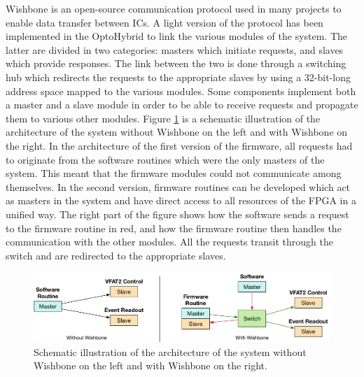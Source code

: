       Wishbone is an open-source communication protocol used in many projects to enable data transfer between ICs. A light version of the protocol has been implemented in the OptoHybrid to link the various modules of the system. The latter are divided in two categories: masters which initiate requests, and slaves which provide responses. The link between the two is done through a switching hub which redirects the requests to the appropriate slaves by using a 32-bit-long address space mapped to the various modules. Some components implement both a master and a slave module in order to be able to receive requests and propagate them to various other modules. Figure \ref{fig:II-3-wishbone-arch} is a schematic illustration of the architecture of the system without Wishbone on the left and with Wishbone on the right. In the architecture of the first version of the firmware, all requests had to originate from the software routines which were the only masters of the system. This meant that the firmware modules could not communicate among themselves. In the second version, firmware routines can be developed which act as masters in the system and have direct access to all resources of the FPGA in a unified way. The right part of the figure shows how the software sends a request to the firmware routine in red, and how the firmware routine then handles the communication with the other modules. All the requests transit through the switch and are redirected to the appropriate slaves. \\

      \begin{figure}[h!]
        \centering
        \includegraphics[width=\textwidth]{img/II-3-test-beam/wishbone_arch}
        \caption{Schematic illustration of the architecture of the system without Wishbone on the left and with Wishbone on the right.}
        \label{fig:II-3-wishbone-arch}
      \end{figure}

